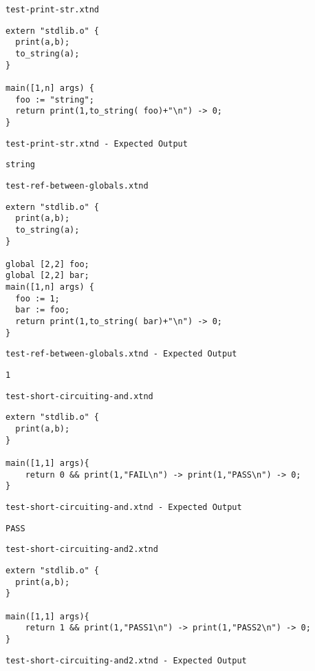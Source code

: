 \medskip \noindent \texttt{test-print-str.xtnd}


\begin{lstlisting}
extern "stdlib.o" {
  print(a,b);
  to_string(a);
}

main([1,n] args) {
  foo := "string";
  return print(1,to_string( foo)+"\n") -> 0;
}
\end{lstlisting}


\medskip \noindent \texttt{test-print-str.xtnd - Expected Output}


\begin{lstlisting}
string
\end{lstlisting}


\medskip \noindent \texttt{test-ref-between-globals.xtnd}


\begin{lstlisting}
extern "stdlib.o" {
  print(a,b);
  to_string(a);
}

global [2,2] foo;
global [2,2] bar;
main([1,n] args) {
  foo := 1;
  bar := foo;
  return print(1,to_string( bar)+"\n") -> 0;
}
\end{lstlisting}


\medskip \noindent \texttt{test-ref-between-globals.xtnd - Expected Output}


\begin{lstlisting}
1
\end{lstlisting}


\medskip \noindent \texttt{test-short-circuiting-and.xtnd}


\begin{lstlisting}
extern "stdlib.o" {
  print(a,b);
}

main([1,1] args){
	return 0 && print(1,"FAIL\n") -> print(1,"PASS\n") -> 0;
}
\end{lstlisting}


\medskip \noindent \texttt{test-short-circuiting-and.xtnd - Expected Output}


\begin{lstlisting}
PASS
\end{lstlisting}


\medskip \noindent \texttt{test-short-circuiting-and2.xtnd}


\begin{lstlisting}
extern "stdlib.o" {
  print(a,b);
}

main([1,1] args){
	return 1 && print(1,"PASS1\n") -> print(1,"PASS2\n") -> 0;
}
\end{lstlisting}


\medskip \noindent \texttt{test-short-circuiting-and2.xtnd - Expected Output}


